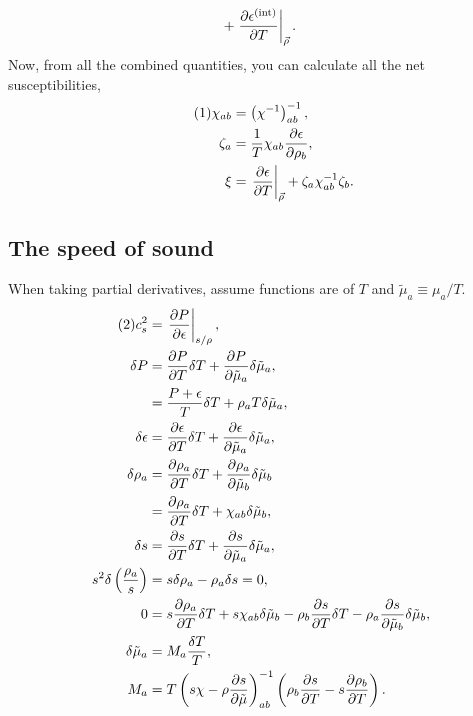 \documentclass[12pt]{article}
\numberwithin{equation}{section}
\numberwithin{figure}{section}
\newcommand\eqnumber{\addtocounter{equation}{1}\tag{\theequation}}
\begin{document}
\begin{enumerate}
\begin{align*}
        +\left.\frac{\partial\epsilon^{\rm(int)}}{\partial T}\right|_{\vec{\rho}}.
        \end{align*}
        Now, from all the combined quantities, you can calculate all the net susceptibilities,
        \begin{align*}\eqnumber
        \chi_{ab}&=\left(\chi^{-1}\right)^{-1}_{ab},\\
        \zeta_a&=\frac{1}{T}\chi_{ab}\frac{\partial\epsilon}{\partial\rho_b},\\
        \xi&=\left.\frac{\partial\epsilon}{\partial T}\right|_{\vec{\rho}}+\zeta_a\chi^{-1}_{ab}\zeta_b.
        \end{align*}
\end{enumerate}

\subsection{The speed of sound}
When taking partial derivatives, assume functions are of $T$ and $\tilde{\mu}_a\equiv\mu_a/T$.
\begin{align*}\eqnumber
c_s^2&=\left.\frac{\partial P}{\partial\epsilon}\right|_{s/\rho},\\
\delta P&=\frac{\partial P}{\partial T}\delta T+\frac{\partial P}{\partial\tilde{\mu}_a}\delta\tilde{\mu}_a,\\
&=\frac{P+\epsilon}{T}\delta T+\rho_aT\delta\tilde{\mu}_a,\\
\delta \epsilon&=\frac{\partial\epsilon}{\partial T}\delta T+\frac{\partial\epsilon}{\partial\tilde{\mu}_a}\delta\tilde{\mu}_a,\\
\delta\rho_a&=\frac{\partial \rho_a}{\partial T}\delta T+\frac{\partial \rho_a}{\partial\tilde{\mu}_b}\delta\tilde{\mu}_b\\
&=\frac{\partial \rho_a}{\partial T}\delta T+\chi_{ab}\delta\tilde{\mu}_b,\\
\delta s&=\frac{\partial s}{\partial T}\delta T+\frac{\partial s}{\partial\tilde{\mu}_a}\delta\tilde{\mu}_a,\\
s^2\delta\left(\frac{\rho_a}{s}\right)&=s\delta\rho_a-\rho_a\delta s=0,\\
0&=s\frac{\partial\rho_a}{\partial T}\delta T+s\chi_{ab}\delta\tilde{\mu}_b
-\rho_b\frac{\partial s}{\partial T}\delta T-\rho_a\frac{\partial s}{\partial\tilde{\mu}_b}\delta\tilde{\mu}_b,\\
\delta\tilde{\mu}_a&=M_a\frac{\delta T}{T},\\
\label{eq:Mdef}
M_a&=T\left(s\chi-\rho\frac{\partial s}{\partial\tilde{\mu}}\right)_{ab}^{-1}
\left(\rho_b\frac{\partial s}{\partial T}-s\frac{\partial\rho_b}{\partial T}\right).
\end{align*}
\end{document}
